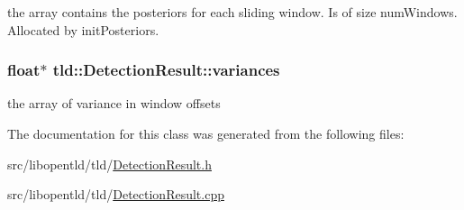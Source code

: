 the array contains the posteriors for each sliding window. Is of size num\-Windows. Allocated by init\-Posteriors. 

\hypertarget{classtld_1_1DetectionResult_ae0725362fbe07964e4ac6861fa1d32fb}{
\subsubsection[{variances}]{\setlength{\rightskip}{0pt plus 5cm}float$\ast$ tld\-::\-Detection\-Result\-::variances}}\label{classtld_1_1DetectionResult_ae0725362fbe07964e4ac6861fa1d32fb}


the array of variance in window offsets 



The documentation for this class was generated from the following files\-:\begin{DoxyCompactItemize}
\item 
src/libopentld/tld/\hyperlink{DetectionResult_8h}{Detection\-Result.\-h}\item 
src/libopentld/tld/\hyperlink{DetectionResult_8cpp}{Detection\-Result.\-cpp}\end{DoxyCompactItemize}
